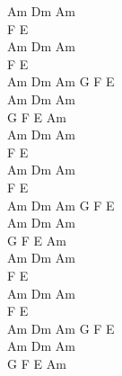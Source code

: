 \begin{chord}
Am Dm Am\\
F E\\
Am Dm Am\\
F E\\

Am Dm Am G F E\\
Am Dm Am\\
G F E Am\\

Am Dm Am\\
F E\\
Am Dm Am\\
F E\\

Am Dm Am G F E\\
Am Dm Am\\
G F E Am\\

Am Dm Am\\
F E\\
Am Dm Am\\
F E\\

Am Dm Am G F E\\
Am Dm Am\\
G F E Am\\
\end{chord}
